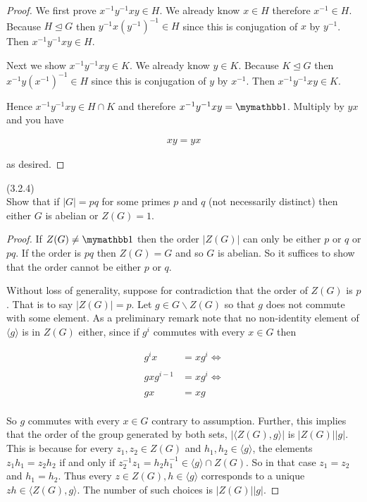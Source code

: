 \documentclass{exam}
\begin{document}
\begin{questions}
\begin{proof}
  We first prove $x^{-1}y^{-1}xy \in H$.  We already know $x\in H$ therefore $x^{-1}\in H$.  Because $H\trianglelefteq G$ then $y^{-1}x(y^{-1})^{-1}\in H$ since this is conjugation of $x$ by $y^{-1}$.  Then $x^{-1}y^{-1}xy\in H$.

  Next we show $x^{-1}y^{-1}xy \in K$.  We already know $y\in K$.  Because $K\trianglelefteq G$ then $x^{-1}y(x^{-1})^{-1}\in H$ since this is conjugation of $y$ by $x^{-1}$.  Then $x^{-1}y^{-1}xy\in K$.

  Hence $x^{-1}y^{-1}xy \in H\cap K$ and therefore $x^{-1}y^{-1}xy =\mymathbb 1$.  Multiply by $yx$ and you have

  \begin{align*}
    xy = yx
  \end{align*}

  as desired.
\end{proof}

\question(3.2.4)\\
Show that if $|G|=pq$ for some primes $p$ and $q$ (not necessarily distinct) then either $G$ is abelian or $Z(G)=1$.

\begin{proof}
  If $Z(G)\ne \mymathbb 1$ then the order $|Z(G)|$ can only be either $p$ or $q$ or $pq$.  If the order is $pq$ then $Z(G)=G$ and so $G$ is abelian.  So it suffices to show that the order cannot be either $p$ or $q$.

  Without loss of generality, suppose for contradiction that the order of $Z(G)$ is $p$.  That is to say $|Z(G)|=p$.  Let $g\in G\smallsetminus Z(G)$ so that $g$ does not commute with some element.  As a preliminary remark note that no non-identity element of $\langle g\rangle$ is in $Z(G)$ either, since if $g^i$ commutes with every $x\in G$ then

  \begin{align*}
    g^i x &= xg^i \Leftrightarrow \\\\
    gxg^{i-1} &= xg^i \Leftrightarrow \\\\
    gx &= xg\\
  \end{align*}

  So $g$ commutes with every $x\in G$ contrary to assumption.  Further, this implies that the order of the group generated by both sets, $|\langle Z(G),g\rangle|$ is $|Z(G)||g|$.  This is because for every $z_1,z_2\in Z(G)$ and $h_1,h_2\in \langle g\rangle$, the elements $z_1h_1 = z_2h_2$ if and only if $z_2^{-1}z_1 = h_2h_1^{-1}\in \langle g\rangle \cap Z(G)$.  So in that case $z_1=z_2$ and $h_1=h_2$.  Thus every $z\in Z(G), h\in \langle g\rangle$ corresponds to a unique $zh\in \langle Z(G),g\rangle$.  The number of such choices is $|Z(G)||g|$.


\end{proof}
\end{questions}
\end{document}
